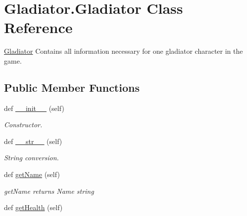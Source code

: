 \hypertarget{classGladiator_1_1Gladiator}{}\section{Gladiator.\+Gladiator Class Reference}
\label{classGladiator_1_1Gladiator}


\hyperlink{classGladiator_1_1Gladiator}{Gladiator} Contains all information necessary for one gladiator character in the game.  


\subsection*{Public Member Functions}
\begin{DoxyCompactItemize}
\item 
\hypertarget{classGladiator_1_1Gladiator_a97bc7846e556803d8aef6bf6db293927}{}def \hyperlink{classGladiator_1_1Gladiator_a97bc7846e556803d8aef6bf6db293927}{\+\_\+\+\_\+init\+\_\+\+\_\+} (self)\label{classGladiator_1_1Gladiator_a97bc7846e556803d8aef6bf6db293927}

\begin{DoxyCompactList}\small\item\em Constructor. \end{DoxyCompactList}\item 
\hypertarget{classGladiator_1_1Gladiator_a75f206f4758b41b32da82713f3a7bf23}{}def \hyperlink{classGladiator_1_1Gladiator_a75f206f4758b41b32da82713f3a7bf23}{\+\_\+\+\_\+str\+\_\+\+\_\+} (self)\label{classGladiator_1_1Gladiator_a75f206f4758b41b32da82713f3a7bf23}

\begin{DoxyCompactList}\small\item\em String conversion. \end{DoxyCompactList}\item 
\hypertarget{classGladiator_1_1Gladiator_a98a4067499f187ebdf0c04ba28d8f1ef}{}def \hyperlink{classGladiator_1_1Gladiator_a98a4067499f187ebdf0c04ba28d8f1ef}{get\+Name} (self)\label{classGladiator_1_1Gladiator_a98a4067499f187ebdf0c04ba28d8f1ef}

\begin{DoxyCompactList}\small\item\em get\+Name returns Name string \end{DoxyCompactList}\item 
\hypertarget{classGladiator_1_1Gladiator_ac7b5a72c5527beb571f029d9b60ad7bb}{}def \hyperlink{classGladiator_1_1Gladiator_ac7b5a72c5527beb571f029d9b60ad7bb}{get\+Health} (self)\label{classGladiator_1_1Gladiator_ac7b5a72c5527beb571f029d9b60ad7bb}


\end{DoxyCompactItemize}
